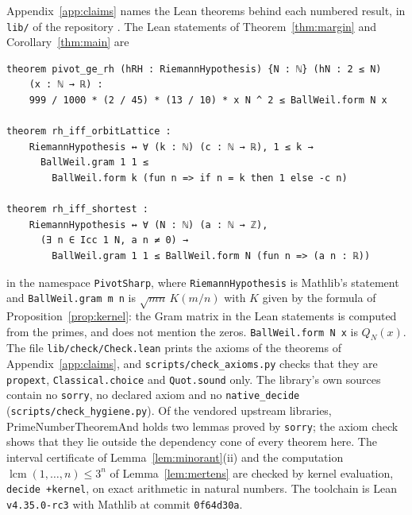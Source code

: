 \documentclass[11pt]{article}
\theoremstyle{definition}
\newcommand{\lean}[1]{\texttt{#1}}
\newcommand{\file}[1]{\nolinkurl{#1}}
\newcommand{\KH}{K}
\begin{document}
Appendix~\ref{app:claims} names the Lean theorems behind each numbered result, in \file{lib/} of the repository
\cite{repo}. The Lean statements of
Theorem~\ref{thm:margin} and Corollary~\ref{thm:main} are
{\footnotesize
\begin{verbatim}
theorem pivot_ge_rh (hRH : RiemannHypothesis) {N : ℕ} (hN : 2 ≤ N)
    (x : ℕ → ℝ) :
    999 / 1000 * (2 / 45) * (13 / 10) * x N ^ 2 ≤ BallWeil.form N x

theorem rh_iff_orbitLattice :
    RiemannHypothesis ↔ ∀ (k : ℕ) (c : ℕ → ℝ), 1 ≤ k →
      BallWeil.gram 1 1 ≤
        BallWeil.form k (fun n => if n = k then 1 else -c n)

theorem rh_iff_shortest :
    RiemannHypothesis ↔ ∀ (N : ℕ) (a : ℕ → ℤ),
      (∃ n ∈ Icc 1 N, a n ≠ 0) →
        BallWeil.gram 1 1 ≤ BallWeil.form N (fun n => (a n : ℝ))
\end{verbatim}
}
\noindent in the namespace \lean{PivotSharp}, where \lean{RiemannHypothesis} is Mathlib's statement and
\lean{BallWeil.gram m n} is $\sqrt{mn}\,\KH(m/n)$ with $\KH$ given by the formula of Proposition~\ref{prop:kernel}: the
Gram matrix in the Lean statements is computed from the primes, and does not mention the zeros. \lean{BallWeil.form N
x} is $Q_N(x)$. The file \file{lib/check/Check.lean} prints the axioms of the theorems of Appendix~\ref{app:claims}, and
\texttt{scripts/check\_axioms.py} checks that they are
\lean{propext}, \lean{Classical.choice} and \lean{Quot.sound} only.
The library's own sources contain no \lean{sorry}, no declared axiom and no \lean{native\_decide}
(\texttt{scripts/check\_hygiene.py}). Of the vendored upstream
libraries, PrimeNumberTheoremAnd holds two lemmas proved by
\lean{sorry}; the axiom check shows that they lie outside the dependency cone of every theorem here. The interval
certificate of Lemma~\ref{lem:minorant}(ii) and the computation
$\operatorname{lcm}(1, \dots, n) \le 3^n$ of Lemma~\ref{lem:mertens} are checked by kernel evaluation, \lean{decide
+kernel}, on exact arithmetic in natural numbers. The toolchain is Lean \texttt{v4.35.0-rc3} with Mathlib at commit
\texttt{0f64d30a}.
\end{document}

